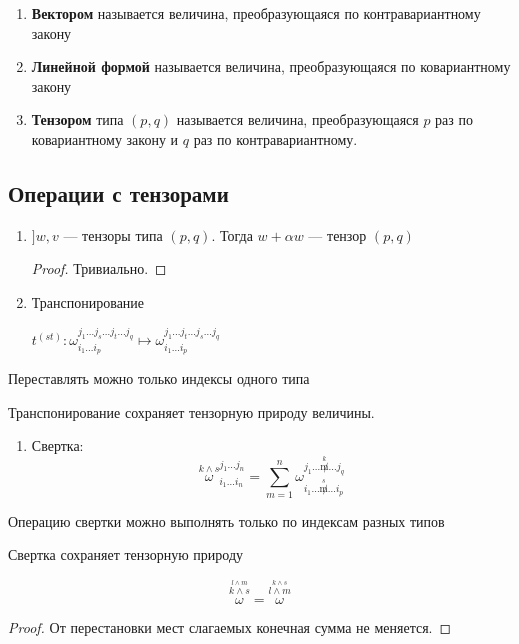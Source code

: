 \begin{definition}
    \begin{enumerate}
        \item \textbf{Вектором} называется величина, преобразующаяся по контравариантному закону
        \item \textbf{Линейной формой} называется величина, преобразующаяся по ковариантному закону
        \item \textbf{Тензором} типа $(p, q)$ называется величина, преобразующаяся $p$ раз по ковариантному закону и $q$ раз по контравариантному.
    \end{enumerate}
\end{definition}

\subsection{Операции с тензорами}

\begin{enumerate}
    \item $] w, v$ --- тензоры типа $(p, q)$. Тогда $w+\alpha w$ --- тензор $(p, q)$
    \begin{proof}
        Тривиально.
    \end{proof}
    \item Транспонирование
    
    $t^{(st)} : \omega^{j_1\ldots j_s \ldots j_t\ldots j_q}_{i_1\ldots i_p}\mapsto\omega^{j_1\ldots j_t \ldots j_s\ldots j_q}_{i_1\ldots i_p}$
\end{enumerate}

\begin{remark}
    Переставлять можно только индексы одного типа
\end{remark}
\begin{lemma}
    Транспонирование сохраняет тензорную природу величины.
\end{lemma}

\begin{enumerate}[resume]
    \item Свертка: $$\stackrel{k\wedge s}{\omega}^{j_1\ldots j_n}_{i_1\ldots i_n} = \sum\limits_{m=1}^n \omega^{j_1\ldots \stackrel{k}{\not m}\ldots j_q}_{i_1\ldots \stackrel{s}{\not m} \ldots i_p}$$
\end{enumerate}
\begin{remark}
    Операцию свертки можно выполнять только по индексам разных типов
\end{remark}
\begin{lemma}
    Свертка сохраняет тензорную природу
\end{lemma}
\begin{lemma}
    $$\stackrel{\stackrel{l\wedge m}{k \wedge s}}{\omega}=\stackrel{\stackrel{k \wedge s}{l\wedge m}}{\omega}$$
\end{lemma}
\begin{proof}
    От перестановки мест слагаемых конечная сумма не меняется.
\end{proof}

